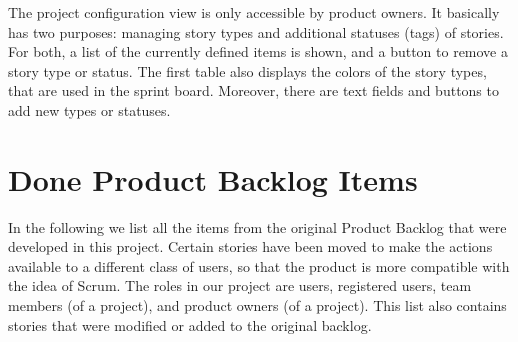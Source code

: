 \documentclass[
	accentcolor=tud1a %
]{tudreport}
\begin{document}
The project configuration view is only accessible by product owners. It basically has two purposes: managing story types and additional statuses (tags) of stories. For both, a list of the currently defined items is shown, and a button to remove a story type or status. The first table also displays the colors of the story types, that are used in the sprint board. Moreover, there are text fields and buttons to add new types or statuses. 




\chapter{Done Product Backlog Items}
\label{ch:done-pbis}

In the following we list all the items from the original Product Backlog that were developed in this project. Certain stories have been moved to make the actions available to a different class of users, so that the product is more compatible with the idea of Scrum. The roles in our project are users, registered users, team members (of a project), and product owners (of a project). This list also contains stories that were modified or added to the original backlog.

\end{document}
